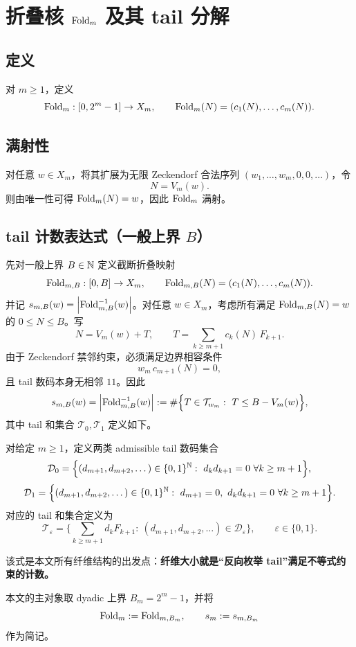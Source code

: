 \section{折叠核 \texorpdfstring{$\mathrm{Fold}_m$}{Fold\_m} 及其 tail 分解}

\subsection{定义}

对 $m\ge 1$，定义
$$
\mathrm{Fold}_m:[0,2^m-1]\to X_m,\qquad \mathrm{Fold}_m(N)=(c_1(N),\dots,c_m(N)).
$$

\subsection{满射性}

对任意 $w\in X_m$，将其扩展为无限 Zeckendorf 合法序列 $(w_1,\dots,w_m,0,0,\dots)$，令
$$
N=V_m(w).
$$
则由唯一性可得 $\mathrm{Fold}_m(N)=w$，因此 $\mathrm{Fold}_m$ 满射。

\subsection{tail 计数表达式（一般上界 \texorpdfstring{$B$}{B}）}

先对一般上界 $B\in\mathbb{N}$ 定义截断折叠映射
$$
\mathrm{Fold}_{m,B}:[0,B]\to X_m,\qquad \mathrm{Fold}_{m,B}(N)=(c_1(N),\dots,c_m(N)).
$$
并记 $s_{m,B}(w)=\left\lvert \mathrm{Fold}_{m,B}^{-1}(w)\right\rvert$。对任意 $w\in X_m$，考虑所有满足 $\mathrm{Fold}_{m,B}(N)=w$ 的 $0\le N\le B$。写
$$
N=V_m(w)+T,\qquad
T=\sum_{k\ge m+1} c_k(N)\,F_{k+1}.
$$
由于 Zeckendorf 禁邻约束，必须满足边界相容条件
$$
w_m\,c_{m+1}(N)=0,
$$
且 tail 数码本身无相邻 $11$。因此
$$
s_{m,B}(w)=\left\lvert \mathrm{Fold}_{m,B}^{-1}(w)\right\rvert
:=\#\Big\{T\in\mathcal{T}_{w_m}:\ T\le B-V_m(w)\Big\},
$$
其中 tail 和集合 $\mathcal{T}_0,\mathcal{T}_1$ 定义如下。

\begin{definition}\label{def:tail-sets}
对给定 $m\ge 1$，定义两类 admissible tail 数码集合
$$
\mathcal{D}_0=\Big\{(d_{m+1},d_{m+2},\dots)\in\{0,1\}^{\NN}:\ d_kd_{k+1}=0\ \forall k\ge m+1\Big\},
$$
$$
\mathcal{D}_1=\Big\{(d_{m+1},d_{m+2},\dots)\in\{0,1\}^{\NN}:\ d_{m+1}=0,\ d_kd_{k+1}=0\ \forall k\ge m+1\Big\}.
$$
对应的 tail 和集合定义为
$$
\mathcal{T}_\varepsilon=\Big\{\sum_{k\ge m+1} d_kF_{k+1}:\ (d_{m+1},d_{m+2},\dots)\in\mathcal{D}_\varepsilon\Big\},\qquad \varepsilon\in\{0,1\}.
$$
\end{definition}

该式是本文所有纤维结构的出发点：\textbf{纤维大小就是“反向枚举 tail”满足不等式约束的计数。}

\medskip
\noindent
本文的主对象取 dyadic 上界 $B_m=2^m-1$，并将
$$
\mathrm{Fold}_m:=\mathrm{Fold}_{m,B_m},\qquad s_m:=s_{m,B_m}
$$
作为简记。

